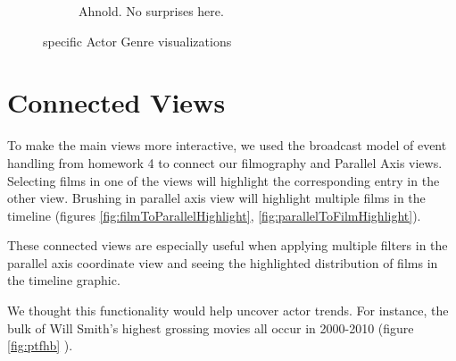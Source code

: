 \documentclass[12pt]{article}
\begin{document}
\begin{figure}[h!]
\begin{subfigure}[t]{.5\textwidth}
		  \caption{Ahnold.  No surprises here.}
		  \label{fig:ArnoldGenre}
		\end{subfigure}%
		\caption{specific Actor Genre visualizations }
		\label{fig:CharacterGenreVis}
	\end{figure}


\newpage



\section{Connected Views}

To make the main views more interactive, we used the broadcast model of event handling from homework 4 to connect our filmography and Parallel Axis views. Selecting films in one of the views will highlight the corresponding entry in the other view.  Brushing in parallel axis view will highlight multiple films in the timeline (figures \ref{fig:filmToParallelHighlight}, 
\ref{fig:parallelToFilmHighlight}).

These connected views are especially useful when applying multiple filters in the parallel axis coordinate view and seeing the highlighted distribution of films in the timeline graphic.

We thought this functionality would help uncover actor trends.  For instance, the bulk of Will Smith's highest grossing movies all occur in 2000-2010 (figure \ref{fig:ptfhb} ).
\end{document}
